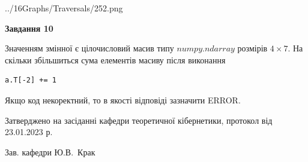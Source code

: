 \documentclass[12pt, ukrainian]{article}
\begin{document}
{\begin {large}
\begin{center}
	{../16Graphs/Traversals/252.png}
\end{center}\par
\newpage

{\begin {center}\textbf{Завдання 10}\end {center}}\par
Значенням змінної  є цілочисловий масив типу $numpy.ndarray$ розмірів $4{\times}7$. На скільки збільшиться сума елементів масиву  після виконання
\begin{verbatim}
a.T[-2] += 1
\end{verbatim}


Якщо код некоректний, то в якості відповіді зазначити ERROR.\par
\newpage


\end {large}
}
{\smallskip \begin {small} Затверджено на засіданні кафедри теоретичної кібернетики, протокол  від   23.01.2023 р.\par\smallskip\smallskip
{\parbox {6.5 cm}{Зав. кафедри \dotfill Ю.В.~Крак}} \end{small}}
\end{document}
